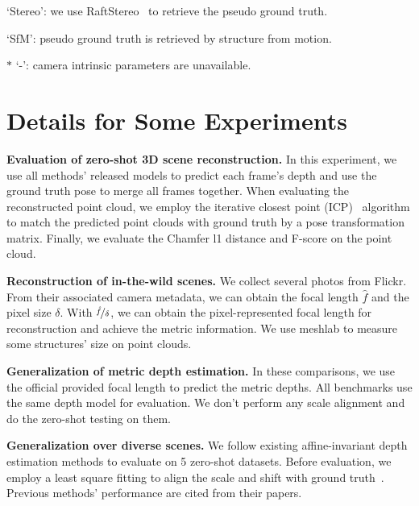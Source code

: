 \documentclass[10pt,onecolumn,letterpaper]{article}
\begin{document}
\begin{table}[]
\begin{threeparttable}
{\begin{tabular}{ r llll}
\end{tabular}}
\begin{tablenotes}
\footnotesize
\item[\dag]`Stereo': we use RaftStereo~\cite{lipson2021raft} to retrieve the pseudo ground truth.
\item[\ddag]`SfM': pseudo ground truth is retrieved by structure from motion.
\item[$\ast$] `-': camera intrinsic parameters are unavailable.
\end{tablenotes}
\end{threeparttable}
\label{table: datasets}
\end{table}

\section{Details for Some Experiments}
\noindent\textbf{Evaluation of zero-shot 3D scene reconstruction.} In this experiment, we use all methods' released models to  predict each frame's depth and use the ground truth pose to merge all frames together. When evaluating the reconstructed point cloud, we employ the iterative closest point (ICP)~\cite{besl1992method} algorithm to match the predicted point clouds with ground truth by a pose transformation matrix. Finally, we evaluate the Chamfer l1 distance and F-score on the point cloud.

\noindent\textbf{Reconstruction of in-the-wild scenes.} We collect several photos from Flickr. From their associated camera metadata, we can obtain the focal length $\hat{f}$ and the pixel size $\delta$. With $\nicefrac{\hat{f}}{\delta}$, we can obtain the pixel-represented focal length for reconstruction and achieve the metric information. We use meshlab to measure some structures' size on point clouds. 

\noindent\textbf{Generalization of metric depth estimation.} In these comparisons, we use the official provided focal length to predict the metric depths. All benchmarks use the same depth model for evaluation. We don't perform any scale alignment and do the zero-shot testing on them. 

\noindent\textbf{Generalization over diverse scenes.} We follow existing affine-invariant depth estimation  methods to evaluate on 5 zero-shot datasets. Before evaluation, we employ a least square fitting to align the scale and shift with ground truth~\cite{leres}. Previous methods' performance are cited from their papers. 
\end{document}
